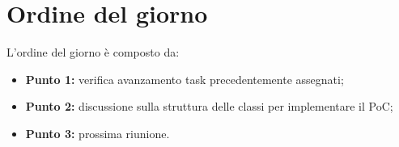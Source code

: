 \section{Ordine del giorno}
L'ordine del giorno è composto da: 
\begin{itemize}
	\item \textbf{Punto 1:} verifica avanzamento task precedentemente assegnati;
	\item \textbf{Punto 2:} discussione sulla struttura delle classi per implementare il PoC;
	\item \textbf{Punto 3:} prossima riunione.
\end{itemize}
